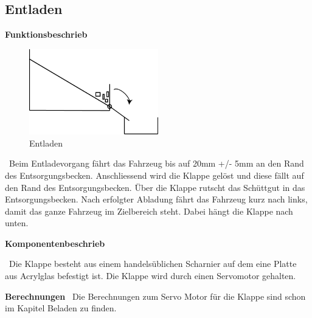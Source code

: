 \subsection{Entladen}

\textbf{Funktionsbeschrieb}\\[0.2cm]
\begin{figure}[H]
\centering
\includegraphics[width=0.5\textwidth]{03_Loesungskonzept/pictures/Entladen_Schraegbehaelter.png}
\caption{Entladen}
\end{figure}

\ Beim Entladevorgang fährt das Fahrzeug bis auf 20mm +/- 5mm an den Rand des Entsorgungsbecken. Anschliessend wird die Klappe gelöst und diese fällt auf den Rand des Entsorgungsbecken. Über die Klappe rutscht das Schüttgut in das Entsorgungsbecken. Nach erfolgter Abladung fährt das Fahrzeug kurz nach links, damit das ganze Fahrzeug im Zielbereich steht. Dabei hängt die Klappe nach unten.

\textbf{Komponentenbeschrieb}

\ Die Klappe besteht aus einem handelsüblichen Scharnier auf dem eine Platte aus Acrylglas befestigt ist.
Die Klappe wird durch einen Servomotor gehalten.

\textbf{Berechnungen}
\ Die Berechnungen zum Servo Motor für die Klappe sind schon im Kapitel Beladen zu finden.